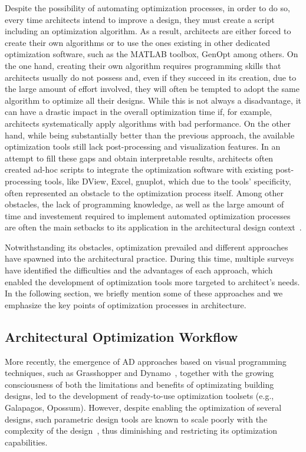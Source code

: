 Despite the possibility of automating optimization processes, in order to do so, every time  architects intend to improve a design, they must create a script including an optimization algorithm. As a result, architects are either forced to create their own algorithms or to use the ones existing in other dedicated optimization software, such as the MATLAB toolbox, GenOpt among others. On the one hand, creating their own algorithm requires programming skills that architects usually do not possess and, even if they succeed in its creation, due to the large amount of effort involved, they will often be tempted to adopt the same algorithm to optimize all their designs. While this is not always a disadvantage, it can have a drastic impact in the overall optimization time if, for example, architects systematically apply algorithms with bad performance. On the other hand, while being substantially better than the previous approach, the available optimization tools still lack post-processing and visualization features. In an attempt to fill these gaps and obtain interpretable results, architects often created ad-hoc scripts to integrate the optimization software with existing post-processing tools, like DView, Excel, gnuplot, which due to the tools' specificity, often represented an obstacle to the optimization process itself. Among other obstacles, the lack of programming knowledge, as well as the large amount of time and investement required to implement automated optimization processes are often the main setbacks to its application in the architectural design context~\cite{Attia2013}. 

Notwithstanding its obstacles, optimization prevailed and different approaches have spawned into the architectural practice. During this time, multiple surveys have identified the difficulties and the advantages of each approach, which enabled the development of optimization tools more targeted to architect's needs. In the following section, we briefly mention some of these approaches and we emphasize the key points of optimization processes in architecture.
	
\subsection{Architectural Optimization Workflow}
	
 More recently, the emergence of \ac{AD} approaches based on visual programming techniques, such as Grasshopper and Dynamo~\cite{GRASSHOPPER,DYNAMOBIM}, together with the growing consciousness of both the limitations and benefits of optimizating building designs, led to the development of ready-to-use optimization toolsets (e.g., Galapagos, Opossum). However, despite enabling the optimization of several designs, such parametric design tools are known to scale poorly with the complexity of the design~\cite{Heijden2015}, thus diminishing and restricting its optimization capabilities. 

